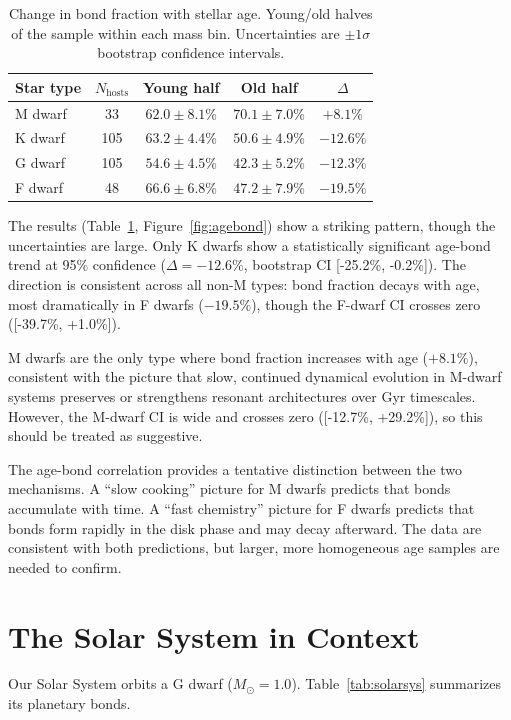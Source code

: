 \documentclass[twocolumn]{aastex631}
\begin{document}
\begin{table}
\centering
\caption{Change in bond fraction with stellar age. Young/old halves of the
sample within each mass bin. Uncertainties are $\pm 1\sigma$ bootstrap
confidence intervals.}
\begin{tabular}{lcccc}
\hline
Star type & $N_{\text{hosts}}$ & Young half & Old half & $\Delta$ \\
\hline
M dwarf & 33 & $62.0\pm 8.1\%$ & $70.1\pm 7.0\%$ & $+8.1\%$ \\
K dwarf & 105 & $63.2\pm 4.4\%$ & $50.6\pm 4.9\%$ & $-12.6\%$ \\
G dwarf & 105 & $54.6\pm 4.5\%$ & $42.3\pm 5.2\%$ & $-12.3\%$ \\
F dwarf & 48 & $66.6\pm 6.8\%$ & $47.2\pm 7.9\%$ & $-19.5\%$ \\
\hline
\end{tabular}
\label{tab:agebond}
\end{table}

The results (Table~\ref{tab:agebond}, Figure~\ref{fig:agebond}) show a
striking pattern, though the uncertainties are large. Only K dwarfs show a
statistically significant age-bond trend at 95\% confidence ($\Delta =
-12.6\%$, bootstrap CI [-25.2\%, -0.2\%]). The direction is consistent across
all non-M types: bond fraction decays with age, most dramatically in F dwarfs
($-19.5\%$), though the F-dwarf CI crosses zero ([-39.7\%, +1.0\%]).

M dwarfs are the only type where bond fraction increases with age
($+8.1\%$), consistent with the picture that slow, continued dynamical
evolution in M-dwarf systems preserves or strengthens resonant architectures
over Gyr timescales. However, the M-dwarf CI is wide and crosses zero
([-12.7\%, +29.2\%]), so this should be treated as suggestive.

The age-bond correlation provides a tentative distinction between the two
mechanisms. A ``slow cooking'' picture for M dwarfs predicts that bonds
accumulate with time. A ``fast chemistry'' picture for F dwarfs predicts that
bonds form rapidly in the disk phase and may decay afterward. The data are
consistent with both predictions, but larger, more homogeneous age samples are
needed to confirm.

\section{The Solar System in Context}

Our Solar System orbits a G dwarf ($M_\odot = 1.0$). Table~\ref{tab:solarsys}
summarizes its planetary bonds.
\end{document}
